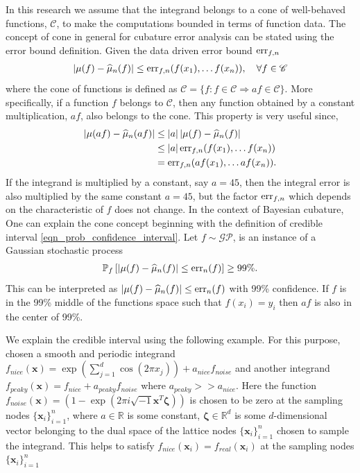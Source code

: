 \documentclass{iitthesis}          %
\newcommand{\bm}[1]{\boldsymbol{#1}}
\newcommand{\vzeta}{{\bm{\zeta}}}
\newcommand{\vx}{\bm{x}}
\newcommand{\hmu}{\widehat{\mu}}
\newcommand{\err}{\textup{err}}
\def\abs#1{\ensuremath{\left \lvert #1 \right \rvert}}
\begin{document}
In this research we assume that the integrand belongs to a cone of well-behaved functions, $\mathscr{C}$, to make the computations bounded in terms of function data. The concept of cone in general for cubature error analysis can be stated using the error bound definition. Given the data driven error bound $\err_{f,n}$
\begin{align*}
\abs{\mu(f) - \hmu_n(f)} \le \err_{f,n}(f(x_1), \dots f(x_n)), \quad \forall f \in \mathscr{C}
\end{align*}  
where the cone of functions is defined as $\mathscr{C} = \{f : f \in \mathscr{C} \Rightarrow a f \in \mathscr{C} \}$. More specifically, if a function $f$ belongs to $\mathscr{C}$, then any function obtained by a constant multiplication, $af$, also belongs to the cone. This property is very useful since,
\begin{align*}
\abs{\mu(a f) - \hmu_n(a f)} &\le \abs{a} \abs{\mu(f) - \hmu_n(f)} \\
& \le \abs{a} \err_{f,n}(f(x_1), \dots f(x_n)) \\
& = \err_{f,n}(a f(x_1), \dots a f(x_n)).
\end{align*}
If the integrand is multiplied by a constant, say $a=45$, then the integral error is also multiplied by the same constant $a=45$, but the factor $\err_{f,n}$ which depends on the characteristic of $f$ does not change.
In the context of Bayesian cubature, One can explain the cone concept beginning with the definition of credible interval \eqref{eqn_prob_confidence_interval}. 
Let $f \sim \mathcal{GP}$, is an instance of a Gaussian stochastic process
\begin{align*}
\mathbb{P}_f \left[
|\mu(f)-\hmu_n(f)| \leq \err_{n}(f) \right] \ge 99\%.
\end{align*}
This can be interpreted as $|\mu(f)-\hmu_n(f)| \leq \err_{n}(f)$ with 99\% confidence. If $f$ is in the 99\% middle of the functions space such that $f(x_i) = y_i$ then $af$ is also in the center of 99\%.

We explain the credible interval using the following example. For this purpose, chosen a smooth and periodic integrand $f_{nice}(\vx) = \exp(\sum_{j=1}^{d} \cos(2\pi x_j)) + a_{nice} f_{noise}$ and another integrand $f_{peaky}(\vx) = f_{nice} + a_{peaky} f_{noise}$ where $a_{peaky} >> a_{nice}$. Here the function $f_{noise}(\vx) = (1 - \exp(2\pi i \sqrt{-1} \vx^T \vzeta))$ is chosen to be zero at the sampling nodes $\{ \vx_i\}_{i=1}^n$, where $a \in \mathbb{R}$ is some constant, $\vzeta \in \mathbb{R}^d$ is some $d$-dimensional vector belonging to the dual space of the lattice nodes $\{ \vx_i\}_{i=1}^n$ chosen to sample the integrand. This helps to satisfy $f_{nice}(\vx_i) = f_{real}(\vx_i) $ at the sampling nodes $\{ \vx_i\}_{i=1}^n$
\end{document}
